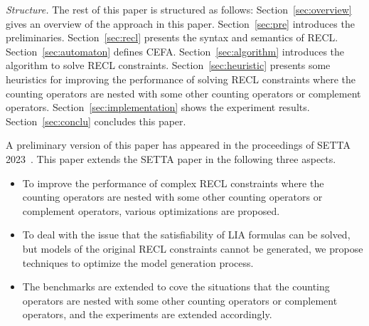 
\smallskip
\noindent
\emph{Structure.} 
The rest of this paper is structured as follows: Section~\ref{sec:overview} gives an overview of the approach in this paper. Section~\ref{sec:pre} introduces the preliminaries. 
Section~\ref{sec:recl} presents the syntax and semantics of RECL. 
Section~\ref{sec:automaton} defines CEFA. Section~\ref{sec:algorithm} introduces the algorithm to solve RECL constraints. 
Section~\ref{sec:heuristic} presents some heuristics for improving the performance of solving RECL constraints where the counting operators are nested with some other counting operators or complement operators. Section~\ref{sec:implementation} shows the experiment results. Section~\ref{sec:conclu} concludes this paper.

\smallskip

A preliminary version of this paper has appeared in the proceedings of SETTA 2023~\cite{Denghang2023}. This paper extends the SETTA paper in the following three aspects.
\begin{itemize}
\item To improve the performance of complex RECL constraints where the counting operators are nested with some other counting operators or complement operators, various optimizations are proposed. 
\item To deal with the issue that the satisfiability of LIA formulas can be solved, but models of the original RECL constraints cannot be generated, we propose techniques to optimize the model generation process.  
\item The benchmarks are extended to cove the situations that the counting operators are nested with some other counting operators or complement operators, and the experiments are extended accordingly.  
\end{itemize}